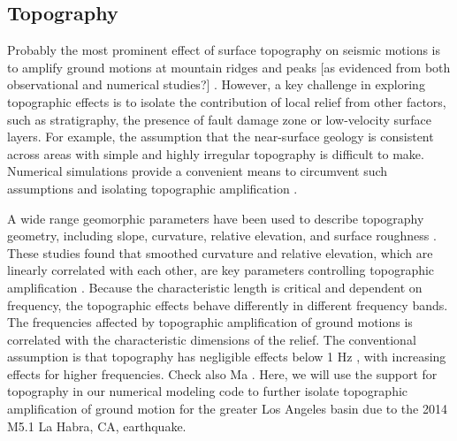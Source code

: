 \subsection{Topography}
Probably the most prominent effect of surface topography on seismic motions is to amplify ground motions at mountain ridges and peaks [as evidenced from both observational and numerical studies?] \citep{celebiTopographicalGeologicalAmplifications1987,kawaseTopographyEffectCritical1990,massaExperimentalApproachEstimating2010,burjanekEmpiricalEvidenceLocal2014}. However, a key challenge in exploring topographic effects is to isolate the contribution of local relief from other factors, such as stratigraphy, the presence of fault damage zone or low-velocity surface layers. For example, the assumption that the near-surface geology is consistent across areas with simple and highly irregular topography  \citep{celebiTopographicalGeologicalAmplifications1987,geliEffectTopographyEarthquake1988,chavez-garciaComplexSiteEffects2000} is difficult to make. Numerical simulations provide a convenient means to circumvent such assumptions and isolating topographic ampliﬁcation \citep{booreNoteEffectSimple1972,sanchez-sesmaDiffractionSVRayleigh1991,lovati2011estimation,hartzellGroundMotionPresence2017}.

 A wide range geomorphic parameters have been used to describe topography geometry, including slope, curvature, relative elevation, and surface roughness \citep{ashfordAnalysisTopographicAmplification1997,nguyenEvaluationSeismicGround2007,bouckovalasNumericalEvaluationSlope2005}. These studies found that smoothed curvature and relative elevation, which are linearly correlated with each other, are key parameters controlling topographic amplification \citep{maufroyFrequencyScaledCurvature2015,raiEmpiricalTerrainBasedTopographic2017}. Because the characteristic length is critical and dependent on frequency, the topographic effects behave differently in different frequency bands. The frequencies affected by topographic amplification of ground motions is correlated with the characteristic dimensions of the relief. The conventional assumption is that topography has negligible effects below 1 Hz \citep{booreNoteEffectSimple1972, pischiuttaTopographicEffectsHill2010}, with increasing effects for higher frequencies. Check also Ma . Here, we will use the support for topography in our numerical modeling code to further isolate topographic amplification of ground motion for the greater Los Angeles basin due to the 2014 M5.1 La Habra, CA, earthquake.


